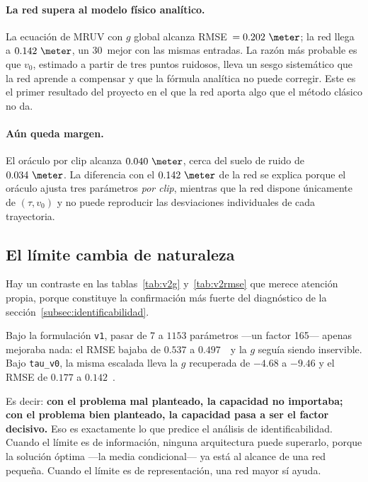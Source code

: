 \documentclass[titlepage,11pt]{article}
\providecommand{\num}[1]{\ensuremath{#1}}
\providecommand{\SI}[2]{#1\,#2}
\providecommand{\percent}{\char37\relax}
\begin{document}
\paragraph{La red supera al modelo físico analítico.} La ecuación de MRUV con
$g$ global alcanza RMSE~$=\num{0.202}~\meter$; la red llega a
$\num{0.142}~\meter$, un \SI{30}{\percent} mejor con las mismas entradas. La
razón más probable es que $v_0$, estimado a partir de tres puntos ruidosos,
lleva un sesgo sistemático que la red aprende a compensar y que la fórmula
analítica no puede corregir. Este es el primer resultado del proyecto en el que
la red aporta algo que el método clásico no da.

\paragraph{Aún queda margen.} El oráculo por clip alcanza
$\num{0.040}~\meter$, cerca del suelo de ruido de $\num{0.034}~\meter$. La
diferencia con el $\num{0.142}~\meter$ de la red se explica porque el oráculo
ajusta tres parámetros \emph{por clip}, mientras que la red dispone únicamente
de $(\tau,v_0)$ y no puede reproducir las desviaciones individuales de cada
trayectoria.

\subsection{El límite cambia de naturaleza}
\label{subsec:v2_capacidad}

Hay un contraste en las tablas~\ref{tab:v2g} y~\ref{tab:v2rmse} que merece
atención propia, porque constituye la confirmación más fuerte del diagnóstico
de la sección~\ref{subsec:identificabilidad}.

Bajo la formulación \texttt{v1}, pasar de 7 a \num{1153} parámetros
---un factor 165--- apenas mejoraba nada: el RMSE bajaba de \num{0.537} a
\num{0.497}~\meter\ y la $g$ seguía siendo inservible. Bajo \texttt{tau\_v0},
la misma escalada lleva la $g$ recuperada de $\num{-4.68}$ a $\num{-9.46}$ y el
RMSE de \num{0.177} a \num{0.142}~\meter.

Es decir: \textbf{con el problema mal planteado, la capacidad no importaba; con
el problema bien planteado, la capacidad pasa a ser el factor decisivo.} Eso es
exactamente lo que predice el análisis de identificabilidad. Cuando el límite es
de información, ninguna arquitectura puede superarlo, porque la solución óptima
---la media condicional--- ya está al alcance de una red pequeña. Cuando el
límite es de representación, una red mayor sí ayuda.
\end{document}

